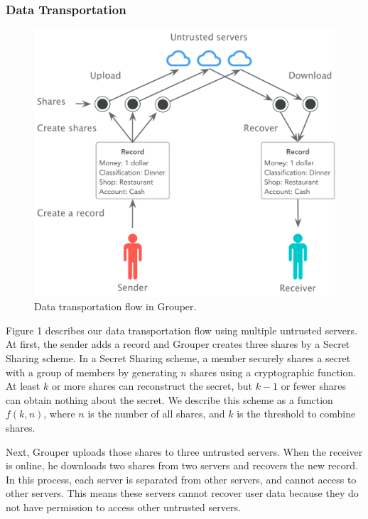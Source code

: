 \documentclass[twocolumn,10pt]{article}
\begin{document}
\subsubsection{Data Transportation}
\begin{figure}[t]
	\centering
	\includegraphics[scale=0.38]{sync_flow}
	\caption{Data transportation flow in Grouper.}
\end{figure}

Figure 1 describes our data transportation flow using multiple untrusted servers. 
At first, the sender adds a record and Grouper creates three shares by a Secret Sharing scheme. 
In a Secret Sharing scheme, a member securely shares a secret with a group of members by generating $n$ shares using a cryptographic function. 
At least $k$ or more shares can reconstruct the secret, but $k-1$ or fewer shares can obtain nothing about the secret\cite{pang2005new}. 
We describe this scheme as a function $f(k, n)$, where $n$ is the number of all shares, and $k$ is the threshold to combine shares. 
 
Next, Grouper uploads those shares to three untrusted servers. 
When the receiver is online, he downloads two shares from two servers and recovers the new record. 
In this process, each server is separated from other servers, and cannot access to other servers. 
This means these servers cannot recover user data because they do not have permission to access other untrusted servers. 
\end{document}
